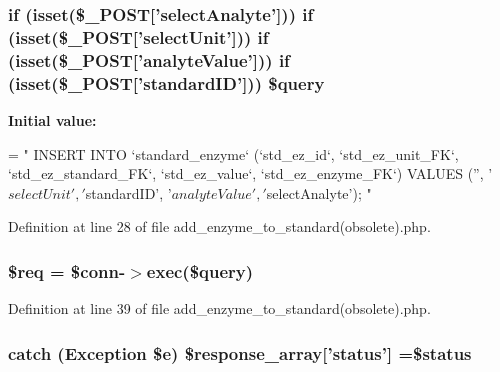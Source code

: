 \hypertarget{add__enzyme__to__standard_07obsolete_08_8php_af80a389c803b49e5cf248f32c14147c9}{
\subsubsection[{\$query}]{\setlength{\rightskip}{0pt plus 5cm}if (isset(\$\-\_\-\-P\-O\-S\-T\mbox{[}'select\-Analyte'\mbox{]})) if (isset(\$\-\_\-\-P\-O\-S\-T\mbox{[}'select\-Unit'\mbox{]})) if (isset(\$\-\_\-\-P\-O\-S\-T\mbox{[}'analyte\-Value'\mbox{]})) if (isset(\$\-\_\-\-P\-O\-S\-T\mbox{[}'standard\-I\-D'\mbox{]})) \$query}}\label{add__enzyme__to__standard_07obsolete_08_8php_af80a389c803b49e5cf248f32c14147c9}
{\bfseries Initial value\-:}
\begin{DoxyCode}
= \textcolor{stringliteral}{"}
\textcolor{stringliteral}{    INSERT INTO }
\textcolor{stringliteral}{    `standard\_enzyme`}
\textcolor{stringliteral}{    (`std\_ez\_id`, `std\_ez\_unit\_FK`, `std\_ez\_standard\_FK`, `std\_ez\_value`, `std\_ez\_enzyme\_FK`) }
\textcolor{stringliteral}{    VALUES }
\textcolor{stringliteral}{    ('', '$selectUnit', '$standardID', '$analyteValue', '$selectAnalyte');}
\textcolor{stringliteral}{    "}
\end{DoxyCode}


Definition at line 28 of file add\-\_\-enzyme\-\_\-to\-\_\-standard(obsolete).\-php.

\hypertarget{add__enzyme__to__standard_07obsolete_08_8php_a63a7a283ea5dee8af1e2d5a3435bf370}{
\subsubsection[{\$req}]{\setlength{\rightskip}{0pt plus 5cm}\$req = \$conn-\/$>$exec(\$query)}}\label{add__enzyme__to__standard_07obsolete_08_8php_a63a7a283ea5dee8af1e2d5a3435bf370}


Definition at line 39 of file add\-\_\-enzyme\-\_\-to\-\_\-standard(obsolete).\-php.

\hypertarget{add__enzyme__to__standard_07obsolete_08_8php_a8452fb8131316637a04e25f5fde066d9}{
\subsubsection[{\$response\-\_\-array}]{\setlength{\rightskip}{0pt plus 5cm}catch (Exception \$e) \$response\-\_\-array\mbox{[}'status'\mbox{]} =\$status}}\label{add__enzyme__to__standard_07obsolete_08_8php_a8452fb8131316637a04e25f5fde066d9}


